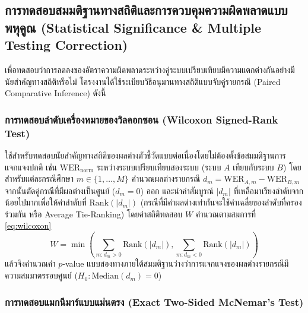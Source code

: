 \subsection{การทดสอบสมมติฐานทางสถิติและการควบคุมความผิดพลาดแบบพหุคูณ (Statistical Significance \& Multiple Testing Correction)}

เพื่อทดสอบว่าการลดลงของอัตราความผิดพลาดระหว่างคู่ระบบเปรียบเทียบมีความแตกต่างกันอย่างมีนัยสำคัญทางสถิติหรือไม่ โครงงานได้ใช้ระเบียบวิธีอนุมานทางสถิติแบบจับคู่รายกรณี (Paired Comparative Inference) ดังนี้

\subsubsection{การทดสอบลำดับเครื่องหมายของวิลคอกซอน (Wilcoxon Signed-Rank Test)}

ใช้สำหรับทดสอบนัยสำคัญทางสถิติของผลต่างตัวชี้วัดแบบต่อเนื่องโดยไม่ต้องตั้งข้อสมมติฐานการแจกแจงปกติ เช่น $\mathrm{WER}_{\mathrm{norm}}$ ระหว่างระบบเปรียบเทียบสองระบบ (ระบบ $A$ เทียบกับระบบ $B$) โดยสำหรับแต่ละกรณีศึกษา $m \in \{1, \dots, M\}$ คำนวณผลต่างรายกรณี $d_m = \mathrm{WER}_{A,m} - \mathrm{WER}_{B,m}$ จากนั้นตัดคู่กรณีที่มีผลต่างเป็นศูนย์ ($d_m = 0$) ออก และนำค่าสัมบูรณ์ $|d_m|$ ที่เหลือมาเรียงลำดับจากน้อยไปมากเพื่อให้ค่าลำดับที่ $\mathrm{Rank}(|d_m|)$ (กรณีที่มีค่าผลต่างเท่ากันจะใช้ค่าเฉลี่ยของลำดับที่ครองร่วมกัน หรือ Average Tie-Ranking) โดยค่าสถิติทดสอบ $W$ คำนวณตามสมการที่ \eqref{eq:wilcoxon} \cite{wilcoxon1945individual}
\begin{equation}
W = \min\left( \sum_{m: d_m > 0} \mathrm{Rank}(|d_m|), \sum_{m: d_m < 0} \mathrm{Rank}(|d_m|) \right)
\label{eq:wilcoxon}
\end{equation}
แล้วจึงคำนวณค่า $p$-value แบบสองทางภายใต้สมมติฐานว่างว่าการแจกแจงของผลต่างรายกรณีมีความสมมาตรรอบศูนย์ ($H_0: \mathrm{Median}(d_m) = 0$)

\subsubsection{การทดสอบแมกนีมาร์แบบแม่นตรง (Exact Two-Sided McNemar's Test)}

